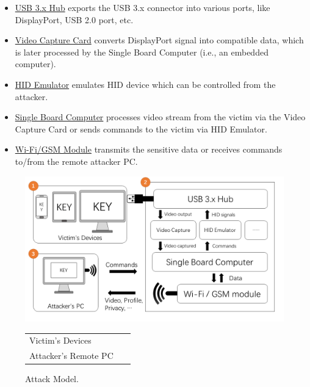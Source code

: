 \begin{itemize}

	\item\underline{USB 3.x Hub} exports the \ac{USB} 3.x connector into various ports, like DisplayPort, \ac{USB} 2.0 port, etc.

	\item\underline{Video Capture Card} converts DisplayPort signal into compatible data, which is later processed by the Single Board Computer (i.e., an embedded computer).

	\item\underline{\ac{HID} Emulator} emulates \ac{HID} device which can be controlled from the attacker.

	\item\underline{Single Board Computer} processes video stream from the victim via the Video Capture Card or sends commands to the victim via \ac{HID} Emulator.

	\item\underline{Wi-Fi/GSM Module} transmits the sensitive data or receives commands to/from the remote attacker PC.

\end{itemize}


\begin{figure}[t]
	\centering
	\includegraphics[width=\linewidth]{./Figs/attack_model.png}

	\begin{tabular}{ll}
	\circled[text=white,fill=myyellow]{\footnotesize{1}} Victim's Devices    &\circled[text=white,fill=myyellow]{\footnotesize{2}}~\tool\\
	\circled[text=white,fill=myyellow]{\footnotesize{3}} Attacker's Remote PC
	\end{tabular}

	\caption{Attack Model.}%
	\label{fig:attack_model}
\end{figure}

